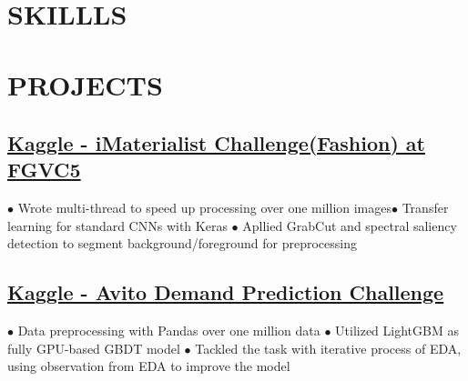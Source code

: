 \documentclass[11pt,a4paper]{moderncv}
\title{  }
\begin{document}
\maketitle
\vspace*{-11mm}

\section{SKILLLS}
\vspace{-0.75\baselineskip}

\section{PROJECTS}
\subsection{\href{https://www.kaggle.com/c/imaterialist-challenge-fashion-2018}{\small Kaggle - iMaterialist Challenge(Fashion) at FGVC5}}
{\footnotesize{$\bullet$ Wrote multi-thread to speed up processing over one million images\space\space $\bullet$ Transfer learning for standard CNNs with Keras
\newline $\bullet$ Apllied GrabCut and spectral saliency detection to segment background/foreground for preprocessing}}

\subsection{\href{https://www.kaggle.com/c/avito-demand-prediction}{\small Kaggle - Avito Demand Prediction Challenge}}
{\footnotesize{$\bullet$ Data preprocessing with Pandas over one million data \space\space $\bullet$ Utilized LightGBM as fully GPU-based GBDT model
\newline $\bullet$ Tackled the task with iterative process of EDA, using observation from EDA to improve the model}}
\end{document}
